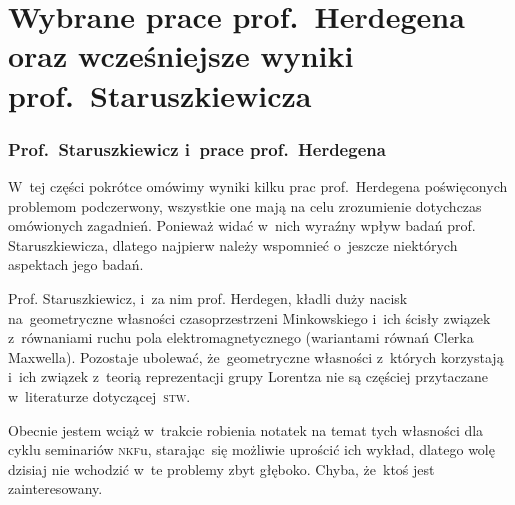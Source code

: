 \documentclass[10pt,t]{beamer}
\begin{document}
\section{Wybrane prace prof.~Herdegena oraz wcześniejsze
  wyniki prof.~Staruszkiewicza}


\begin{frame}
  \frametitle{Prof.~Staruszkiewicz i~prace prof.~Herdegena}


  W~tej części pokrótce omówimy wyniki kilku prac prof.~Herdegena
  poświęconych problemom podczerwony, wszystkie one mają na celu
  zrozumienie dotychczas omówionych zagadnień. Ponieważ widać w~nich
  wyraźny wpływ badań prof. Staruszkiewicza, dlatego najpierw należy
  wspomnieć o~jeszcze niektórych aspektach jego badań.

  Prof. Staruszkiewicz, i~za nim prof. Herdegen, kładli duży nacisk
  na~geometryczne własności czasoprzestrzeni Minkowskiego i~ich ścisły
  związek z~równaniami ruchu pola elektromagnetycznego (wariantami równań
  Clerka Maxwella). Pozostaje ubolewać, że~geometryczne własności z~których
  korzystają i~ich związek z~teorią reprezentacji grupy Lorentza nie są
  częściej przytaczane w~literaturze dotyczącej~\textsc{stw}.

  Obecnie jestem wciąż w~trakcie robienia notatek na temat tych własności
  dla cyklu seminariów \textsc{nkf}u, starając~się możliwie uprościć ich
  wykład, dlatego wolę dzisiaj nie wchodzić w~te problemy zbyt głęboko.
  Chyba, że~ktoś jest zainteresowany.

\end{frame}
\end{document}
